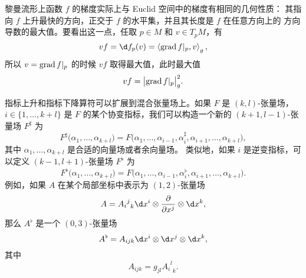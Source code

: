 黎曼流形上函数 $f$ 的梯度实际上与 Euclid 空间中的梯度有相同的几何性质：
其指向 $f$ 上升最快的方向，正交于 $f$ 的水平集，并且其长度是 $f$ 在任意方向上的
方向导数的最大值。要看出这一点，任取 $p\in M$ 和 $v\in T_pM$，有
\[
  vf=\d f_p(v)=  \inn{\grad f|_p,v}_g,
\]
所以 $v=\operatorname{grad} f|_p$ 的时候 $vf$ 取得最大值，此时最大值
\[
  vf=\bigl|\operatorname{grad} f|_p\bigr|_g^2.
\]

指标上升和指标下降算符可以扩展到混合张量场上。如果 $F$ 是 $(k,l)$-张量场，
$i\in\{1,\dots,k+l\}$ 是 $F$ 的某个协变指标，我们可以构造一个新的 $(k+1,l-1)$-张量场
$F^\sharp$ 为
\[
  F^\sharp\bigl(\alpha_1,\dots,\alpha_{k+l}\bigr)=
  F\bigl(\alpha_1,\dots,\alpha_{i-1},\alpha_i^\sharp,\alpha_{i+1},\dots,\alpha_{k+l}\bigr),
\]
其中 $\alpha_1,\dots,\alpha_{k+l}$ 是合适的向量场或者余向量场。
类似地，如果 $i$ 是逆变指标，可以定义 $(k-1,l+1)$-张量场 $F^\flat$
为
\[
  F^\flat\bigl(\alpha_1,\dots,\alpha_{k+l}\bigr)=
  F\bigl(\alpha_1,\dots,\alpha_{i-1},\alpha_i^\flat,\alpha_{i+1},\dots,\alpha_{k+l}\bigr).
\]
例如，如果 $A$ 在某个局部坐标中表示为 $(1,2)$-张量场
\[
  A={{A_{i}}^j}_k\d x^i\otimes \frac{\partial}{\partial x^j}\otimes \d x^k,
\]
那么 $A^\flat$ 是一个 $(0,3)$-张量场
\[
  A^\flat =A_{ijk}\d x^i\otimes \d x^j\otimes \d x^k,  
\]
其中
\[
  A_{ijk}= g_{jl}  {{A_{i}}^l}_k.
\]

